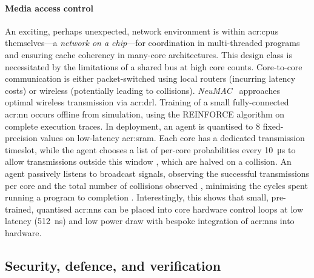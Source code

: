 \paragraph{Media access control}
An exciting, perhaps unexpected, network environment is within \glspl{acr:cpu} themselves---a \emph{network on a chip}---for coordination in multi-threaded programs and ensuring cache coherency in many-core architectures.
This design class is necessitated by the limitations of a shared bus at high core counts.
Core-to-core communication is either packet-switched using local routers (incurring latency costs) or wireless (potentially leading to collisions).
\emph{NeuMAC}~\parencite{DBLP:conf/nsdi/JogLFFATH21} approaches optimal wireless transmission via \gls{acr:drl}.
Training of a small fully-connected \gls{acr:nn} occurs offline from simulation, using the REINFORCE algorithm on complete execution traces.
In deployment, an agent is quantised to \qty{8}{\bit} fixed-precision values on low-latency \gls{acr:sram}.
Each core has a dedicated transmission timeslot, while the agent chooses a list of per-core probabilities every \qty{10}{\micro\second} to allow transmissions outside this window \prllitactreal{}, which are halved on a collision.
An agent passively listens to broadcast signals, observing the successful transmissions per core and the total number of collisions observed \prllitstate{}, minimising the cycles spent running a program to completion \prllitreward{}.
Interestingly, this shows that small, pre-trained, quantised \glspl{acr:nn} can be placed into core hardware control loops at low latency (\qty{512}{\nano\second}) and low power draw with bespoke integration of \glspl{acr:nn} into hardware.


\subsection{Security, defence, and verification}\label{sec:ddn-uses-security}
